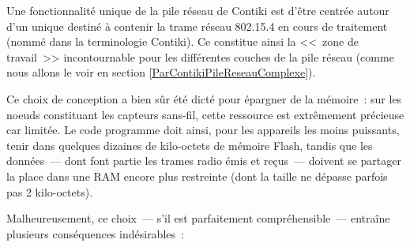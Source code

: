 Une fonctionnalité unique de la pile réseau de Contiki est d'être centrée
autour d'un unique  destiné à contenir la trame réseau
802.15.4 en cours de traitement (nommé  dans la
terminologie Contiki). Ce  constitue ainsi la <<~zone de
travail~>> incontournable pour les différentes couches de la pile réseau
(comme nous allons le voir en section
\vref{ParContikiPileReseauComplexe}).

Ce choix de conception a bien sûr été dicté pour épargner de la mémoire~:
sur les noeuds constituant les capteurs sans-fil, cette ressource est
extrêmement précieuse car limitée. Le code programme doit ainsi, pour les
appareils les moins puissants, tenir dans quelques dizaines de kilo-octets
de mémoire Flash, tandis que les données~--- dont font partie les trames
radio émis et reçus~--- doivent se partager la place dans une RAM encore
plus restreinte (dont la taille ne dépasse parfois pas 2 kilo-octets).

\medskip

Malheureusement, ce choix~--- s'il est parfaitement compréhensible~---
entraîne plusieurs conséquences indésirables~:

